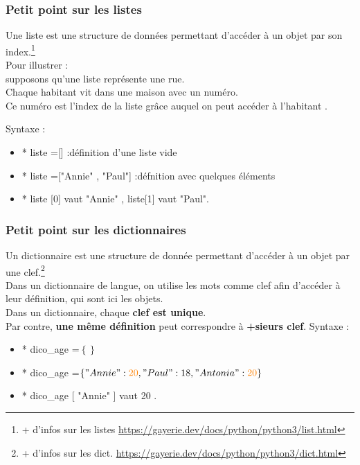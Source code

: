 \begin{frame}
  \frametitle{Petit point sur les listes}
   Une liste est une structure de données permettant d'accéder
à un objet par son index.\footnote{+ d'infos sur les listes \url{https://gayerie.dev/docs/python/python3/list.html}}\\


 Pour illustrer :\\
 supposons qu'une liste représente une rue.\\
Chaque habitant vit dans une maison avec un numéro.\\
 Ce numéro est l'index de la liste grâce auquel on peut accéder
à l'habitant .


Syntaxe :
\begin{itemize}
\item* liste =[] :définition d'une liste vide
\item* liste =["Annie" , "Paul"] :défnition avec quelques éléments
\item* liste [0] vaut "Annie" , liste[1] vaut "Paul".
\end{itemize}



\end{frame}
\begin{frame}
  \frametitle{Petit point sur les dictionnaires}

 Un dictionnaire est une structure de donnée permettant
d'accéder à un objet par une clef.\footnote{+ d'infos sur les dict. \url{https://gayerie.dev/docs/python/python3/dict.html}}\\
 Dans un dictionnaire de langue, on utilise les mots
comme clef afin d'accéder à leur définition, qui sont ici
les objets.\\
 Dans un dictionnaire, chaque \textbf{clef est unique}.\\
 Par contre, \textbf{une même définition} peut correspondre à
\textbf{+sieurs clef}.
Syntaxe :
\begin{itemize}
\item* dico\_age =$\left\{\right\}$
\item* dico\_age =$\left\{ "Annie" : \textcolor{orange}{20} , "Paul" :18, "Antonia":  \textcolor{orange}{20} \right\}$
\item* dico\_age [ "Annie" ] vaut 20 .
\end{itemize}
\end{frame}

